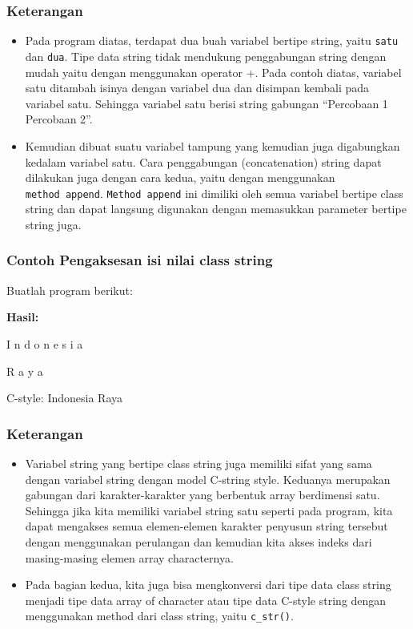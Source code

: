 {{\subsubsection*{Keterangan}

\begin{itemize}

\item
 Pada program diatas, terdapat dua buah variabel bertipe string, yaitu
 \texttt{satu} dan \texttt{dua}. Tipe data string tidak mendukung
 penggabungan string dengan mudah yaitu dengan menggunakan operator +.
 Pada contoh diatas, variabel satu ditambah isinya dengan variabel dua
 dan disimpan kembali pada variabel satu. Sehingga variabel satu berisi
 string gabungan ``Percobaan 1 Percobaan 2''.
\item
 Kemudian dibuat suatu variabel tampung yang kemudian juga digabungkan
 kedalam variabel satu. Cara penggabungan (concatenation) string dapat
 dilakukan juga dengan cara kedua, yaitu dengan menggunakan
 \texttt{method\ append}. \texttt{Method\ append} ini dimiliki oleh
 semua variabel bertipe class string dan dapat langsung digunakan
 dengan memasukkan parameter bertipe string juga.
\end{itemize}

\subsubsection*{Contoh Pengaksesan isi nilai class string}

Buatlah program berikut:



\textbf{Hasil:}

\begin{lcverbatim}
I
n
d
o
n
e
s
i
a


R
a
y
a

C-style: Indonesia Raya
\end{lcverbatim}

\subsubsection*{Keterangan}

\begin{itemize}

\item
 Variabel string yang bertipe class string juga memiliki sifat yang
 sama dengan variabel string dengan model C-string style. Keduanya
 merupakan gabungan dari karakter-karakter yang berbentuk array
 berdimensi satu. Sehingga jika kita memiliki variabel string satu
 seperti pada program, kita dapat mengakses semua elemen-elemen
 karakter penyusun string tersebut dengan menggunakan perulangan dan
 kemudian kita akses indeks dari masing-masing elemen array
 characternya.
\item
 Pada bagian kedua, kita juga bisa mengkonversi dari tipe data class
 string menjadi tipe data array of character atau tipe data C-style
 string dengan menggunakan method dari class string, yaitu
 \texttt{c\_str()}.
\end{itemize}

}}
